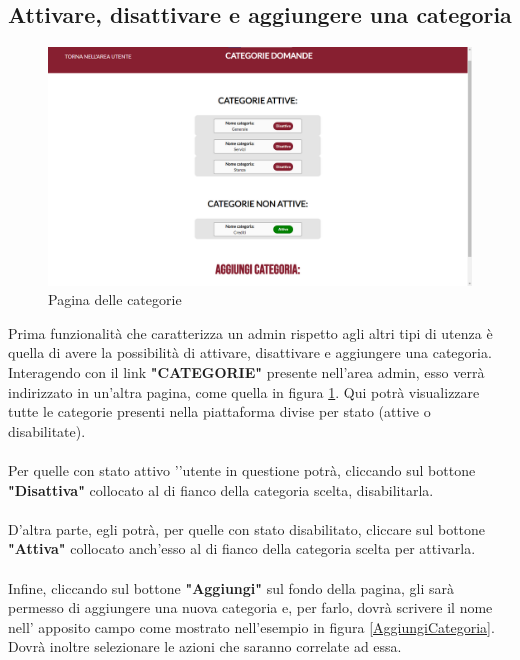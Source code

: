 \documentclass [a4paper, 12pt]{book}
\begin{document}
\subsection{Attivare, disattivare e aggiungere una categoria}
\begin{figure}[h]
\centering
\includegraphics[scale=0.3]{Categorie.png}
\caption{Pagina delle categorie}
\label{Categorie}
\end{figure}
Prima funzionalità che caratterizza un admin rispetto agli altri tipi di utenza è quella di avere la possibilità di attivare, disattivare e aggiungere una categoria. 
Interagendo con il link \textbf{"CATEGORIE"} presente nell'area admin, esso verrà indirizzato in un'altra pagina, come quella in figura \ref{Categorie}. Qui potrà visualizzare tutte le categorie presenti nella piattaforma divise per stato (attive o disabilitate).\\\\
Per quelle con stato attivo '’utente in questione potrà, cliccando sul bottone \textbf{"Disattiva"} collocato al di fianco della categoria scelta, disabilitarla.\\\\ 
D'altra parte, egli potrà, per quelle con stato disabilitato, cliccare sul bottone \textbf{"Attiva"} collocato anch'esso al di fianco della categoria scelta per attivarla. \\\\
Infine, cliccando sul bottone \textbf{"Aggiungi"} sul fondo della pagina, gli sarà permesso di aggiungere una nuova categoria e, per farlo, dovrà scrivere il nome nell' apposito campo come mostrato nell'esempio in figura \ref{AggiungiCategoria}. Dovrà inoltre selezionare le azioni che saranno correlate ad essa.
\end{document}
